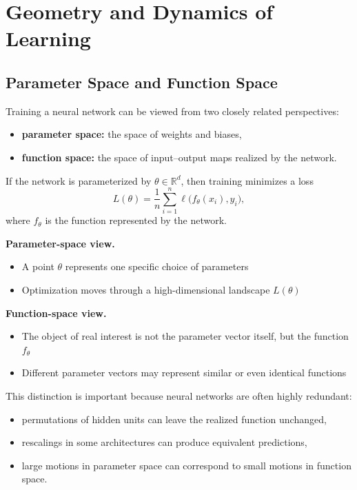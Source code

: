 \chapter{Geometry and Dynamics of Learning}

\section{Parameter Space and Function Space}

Training a neural network can be viewed from two closely related perspectives:
\begin{itemize}
    \item \textbf{parameter space:} the space of weights and biases,
    \item \textbf{function space:} the space of input--output maps realized by the network.
\end{itemize}

\medskip

\noindent
If the network is parameterized by \(\theta \in \mathbb{R}^d\), then training minimizes a loss
\[
L(\theta) = \frac{1}{n}\sum_{i=1}^n \ell\bigl(f_\theta(x_i),y_i\bigr),
\]
where \(f_\theta\) is the function represented by the network.

\medskip

\noindent
\textbf{Parameter-space view.}
\begin{itemize}
    \item A point \(\theta\) represents one specific choice of parameters
    \item Optimization moves through a high-dimensional landscape \(L(\theta)\)
\end{itemize}

\medskip

\noindent
\textbf{Function-space view.}
\begin{itemize}
    \item The object of real interest is not the parameter vector itself, but the function \(f_\theta\)
    \item Different parameter vectors may represent similar or even identical functions
\end{itemize}

\medskip

\noindent
This distinction is important because neural networks are often highly redundant:
\begin{itemize}
    \item permutations of hidden units can leave the realized function unchanged,
    \item rescalings in some architectures can produce equivalent predictions,
    \item large motions in parameter space can correspond to small motions in function space.
\end{itemize}

